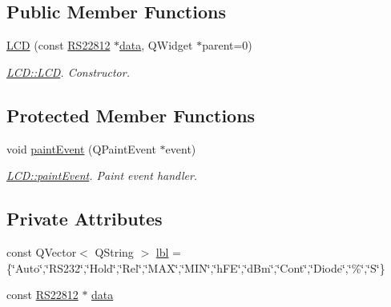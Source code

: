 \subsection*{Public Member Functions}
\begin{DoxyCompactItemize}
\item 
\hyperlink{class_l_c_d_a525b305d4aaf0d45cfd04b9b16096482}{L\-C\-D} (const \hyperlink{class_r_s22812}{R\-S22812} $\ast$\hyperlink{class_l_c_d_a04c1fe4d60f692978d1d428521e2d2a2}{data}, Q\-Widget $\ast$parent=0)
\begin{DoxyCompactList}\small\item\em \hyperlink{class_l_c_d_a525b305d4aaf0d45cfd04b9b16096482}{L\-C\-D\-::\-L\-C\-D}. Constructor. \end{DoxyCompactList}\end{DoxyCompactItemize}
\subsection*{Protected Member Functions}
\begin{DoxyCompactItemize}
\item 
void \hyperlink{class_l_c_d_a259fac152add9afdeb4543af4998d14b}{paint\-Event} (Q\-Paint\-Event $\ast$event)
\begin{DoxyCompactList}\small\item\em \hyperlink{class_l_c_d_a259fac152add9afdeb4543af4998d14b}{L\-C\-D\-::paint\-Event}. Paint event handler. \end{DoxyCompactList}\end{DoxyCompactItemize}
\subsection*{Private Attributes}
\begin{DoxyCompactItemize}
\item 
const Q\-Vector$<$ Q\-String $>$ \hyperlink{class_l_c_d_a80e55f48f0e7c7b791fe1602640f708a}{lbl} =\{\char`\"{}Auto\char`\"{},\char`\"{}R\-S232\char`\"{},\char`\"{}Hold\char`\"{},\char`\"{}Rel\char`\"{},\char`\"{}M\-A\-X\char`\"{},\char`\"{}M\-I\-N\char`\"{},\char`\"{}h\-F\-E\char`\"{},\char`\"{}d\-Bm\char`\"{},\char`\"{}Cont\char`\"{},\char`\"{}Diode\char`\"{},\char`\"{}\%\char`\"{},\char`\"{}S\char`\"{}\}
\item 
const \hyperlink{class_r_s22812}{R\-S22812} $\ast$ \hyperlink{class_l_c_d_a04c1fe4d60f692978d1d428521e2d2a2}{data}
\end{DoxyCompactItemize}


